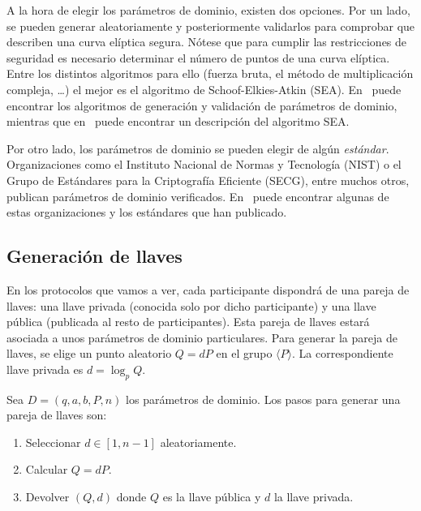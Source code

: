 A la hora de elegir los parámetros de dominio, existen dos opciones. Por un lado, se pueden generar aleatoriamente y posteriormente validarlos para comprobar que describen una curva elíptica segura. Nótese que para cumplir las restricciones de seguridad es necesario determinar el número de puntos de una curva elíptica. Entre los distintos algoritmos para ello (fuerza bruta, el método de multiplicación compleja, \ldots) el mejor es el algoritmo de Schoof-Elkies-Atkin (SEA). En~\cite[cap. 4]{Hankerson:2003} puede encontrar los algoritmos de generación y validación de parámetros de dominio, mientras que en~\cite[cap. XI]{Silverman:2009} puede encontrar un descripción del algoritmo SEA.

Por otro lado, los parámetros de dominio se pueden elegir de algún \emph{estándar}. Organizaciones como el Instituto Nacional de Normas y Tecnología (NIST) o el Grupo de Estándares para la Criptografía Eficiente (SECG), entre muchos otros, publican parámetros de dominio verificados. En~\cite[apéndice B]{Hankerson:2003} puede encontrar algunas de estas organizaciones y los estándares que han publicado.

\subsection{Generación de llaves}
\label{sub:Pareja de llaves}

En los protocolos que vamos a ver, cada participante dispondrá de una pareja de llaves: una llave privada (conocida solo por dicho participante) y una llave pública (publicada al resto de participantes). Esta pareja de llaves estará asociada a unos parámetros de dominio particulares. Para generar la pareja de llaves, se elige un punto aleatorio $Q = d P$ en el grupo $\langle P \rangle$. La correspondiente llave privada es $d = \log_p Q$.

\begin{algoritmo}\label{alg:pareja de llaves}
    Sea $D = (q, a, b, P, n)$ los parámetros de dominio. Los pasos para generar una pareja de llaves son:
    \begin{enumerate}
        \item Seleccionar $d \in [1, n -1]$ aleatoriamente.
        \item Calcular $Q = d P$.
        \item Devolver $(Q, d)$ donde $Q$ es la llave pública y $d$ la llave privada.
    \end{enumerate}
\end{algoritmo}

